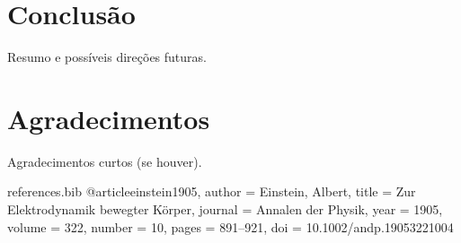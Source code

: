\documentclass[11pt,a4paper]{article}
\begin{document}
\section{Conclusão}
Resumo e possíveis direções futuras.

\section*{Agradecimentos}
Agradecimentos curtos (se houver).

\printbibliography

\begin{filecontents}{references.bib}
@article{einstein1905,
  author = {Einstein, Albert},
  title = {Zur Elektrodynamik bewegter K{\"o}rper},
  journal = {Annalen der Physik},
  year = {1905},
  volume = {322},
  number = {10},
  pages = {891--921},
  doi = {10.1002/andp.19053221004}
}
\end{filecontents}
\end{document}
